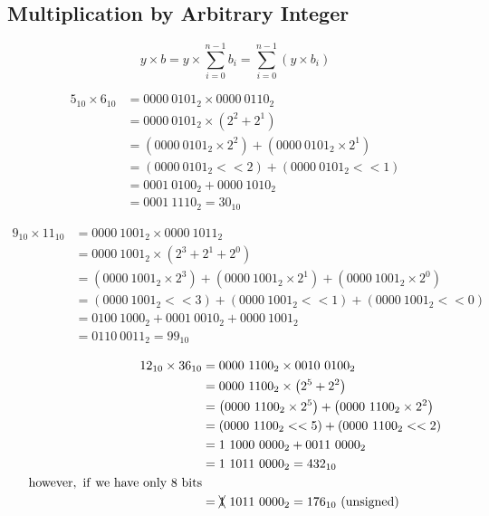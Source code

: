 \documentclass{article}
\begin{document}
\subsection{Multiplication by Arbitrary Integer}

\[ y \times b = y \times \sum_{i=0}^{n-1}b_i = \sum_{i=0}^{n-1}\left( y \times b_i \right) \]

\begin{align*}
5_{10} \times 6_{10} &= 0000\ 0101_2 \times 0000\ 0110_2 \\
                     &= 0000\ 0101_2 \times \left( 2^2 + 2^1 \right) \\
                     &= \left( 0000\ 0101_2 \times 2^2 \right) + \left( 0000\ 0101_2 \times 2^1 \right) \\
                     &= (0000\ 0101_2 << 2) + (0000\ 0101_2 << 1) \\
                     &= 0001\ 0100_2 + 0000\ 1010_2 \\
                     &= 0001\ 1110_2 = 30_{10}
\end{align*}

\begin{align*}
9_{10} \times 11_{10} &= 0000\ 1001_2 \times 0000\ 1011_2 \\
                      &= 0000\ 1001_2 \times \left( 2^3 + 2^1 + 2^0 \right) \\
                      &= \left( 0000\ 1001_2 \times 2^3 \right) + \left( 0000\ 1001_2 \times 2^1 \right) + \left( 0000\ 1001_2 \times 2^0 \right) \\
                      &= (0000\ 1001_2 << 3) + (0000\ 1001_2 << 1) + (0000\ 1001_2 << 0) \\
                      &= 0100\ 1000_2 + 0001\ 0010_2 + 0000\ 1001_2 \\
                      &= 0110\ 0011_2 = 99_{10}
\end{align*}

\begin{align*}
12_{10} \times 36_{10} &= 0000\ 1100_2 \times 0010\ 0100_2 \\
                       &= 0000\ 1100_2 \times \left( 2^5 + 2^2 \right) \\
                       &= \left( 0000\ 1100_2 \times 2^5 \right) + \left( 0000\ 1100_2 \times 2^2 \right) \\
                       &= (0000\ 1100_2 << 5) + (0000\ 1100_2 << 2) \\
                       &= 1\ 1000\ 0000_2 + 0011\ 0000_2 \\
                       &= 1\ 1011\ 0000_2 = 432_{10} \\
\mathrm{however,\ if\ we\ have\ only\ 8\ bits} & \\
                       &= \xcancel{1}\ 1011\ 0000_2 = 176_{10}\ \mathrm{(unsigned)} \\
\end{align*}
\end{document}
